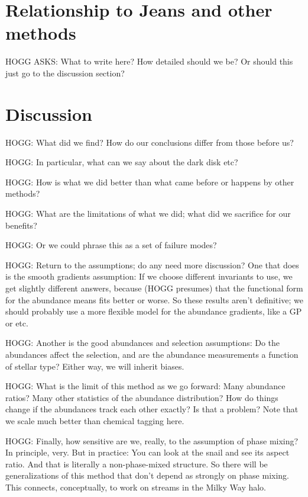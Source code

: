 \documentclass[modern]{aastex63}
\begin{document}
\section{Relationship to Jeans and other methods}

HOGG ASKS: What to write here? How detailed should we be? Or should this just
go to the discussion section?

\section{Discussion}

HOGG: What did we find? How do our conclusions differ from those before us?

HOGG: In particular, what can we say about the dark disk etc?

HOGG: How is what we did better than what came before or happens by other methods?

HOGG: What are the limitations of what we did; what did we sacrifice for our benefits?

HOGG: Or we could phrase this as a set of failure modes?

HOGG: Return to the assumptions; do any need more discussion? One that does is the smooth
gradients assumption: If we choose different invariants to use, we get slightly different
answers, because (HOGG presumes) that the functional form for the abundance means fits
better or worse. So these results aren't definitive; we should probably use a more flexible
model for the abundance gradients, like a GP or etc.

HOGG: Another is the good abundances and selection assumptions: Do the abundances affect
the selection, and are the abundance measurements a function of stellar type? Either way,
we will inherit biases.

HOGG: What is the limit of this method as we go forward: Many abundance ratios? Many other
statistics of the abundance distribution? How do things change if the abundances track
each other exactly? Is that a problem? Note that we scale much better than chemical tagging
here.

HOGG: Finally, how sensitive are we, really, to the assumption of
phase mixing? In principle, very. But in practice: You can look at the
snail and see its aspect ratio. And that is literally a
non-phase-mixed structure. So there will be generalizations of this
method that don't depend as strongly on phase mixing. This connects,
conceptually, to work on streams in the Milky Way halo.
\end{document}
